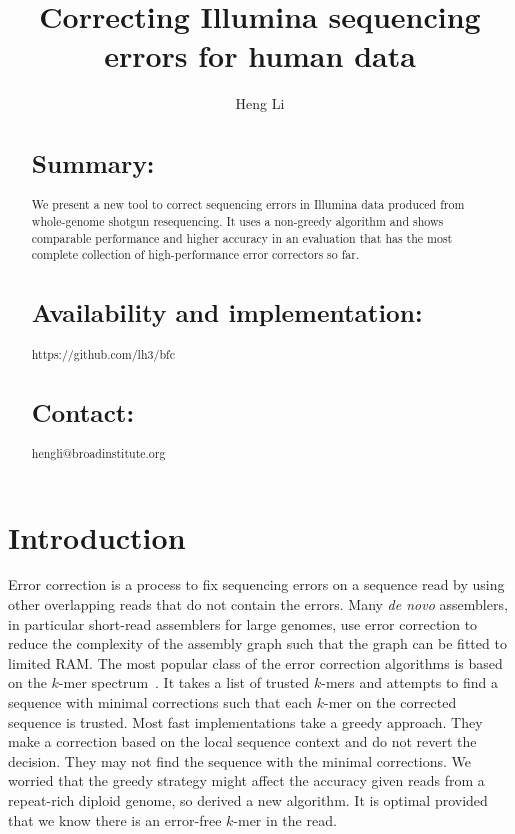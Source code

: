 \documentclass{bioinfo}
\begin{document}

\title[Error Correction for Illumina Data]{Correcting Illumina sequencing errors for human data}

\author[Li]{Heng Li}

\address{Broad Institute, 75 Ames Street, Cambridge, MA 02142, USA}

\maketitle

\begin{abstract}
\section{Summary:} We present a new tool to correct sequencing errors in
Illumina data produced from whole-genome shotgun resequencing. It uses a
non-greedy algorithm and shows comparable performance and higher accuracy in an
evaluation that has the most complete collection of high-performance error
correctors so far.

\section{Availability and implementation:} https://github.com/lh3/bfc

\section{Contact:} hengli@broadinstitute.org
\end{abstract}

\section{Introduction}

Error correction is a process to fix sequencing errors on a sequence read
by using other overlapping reads that do not contain the errors. Many \emph{de
novo} assemblers, in particular short-read assemblers for large genomes, use
error correction to reduce the complexity of the assembly graph such that the
graph can be fitted to limited RAM. The most popular class of the error
correction algorithms is based on the $k$-mer spectrum~\citep{Pevzner:2001vn}.
It takes a list of trusted $k$-mers and attempts to find a sequence with
minimal corrections such that each $k$-mer on the corrected sequence is
trusted. Most fast implementations take a greedy approach. They make a
correction based on the local sequence context and do not revert the decision.
They may not find the sequence with the minimal corrections. We worried that
the greedy strategy might affect the accuracy given reads from a repeat-rich
diploid genome, so derived a new algorithm. It is optimal provided that we know
there is an error-free $k$-mer in the read.
\end{document}
